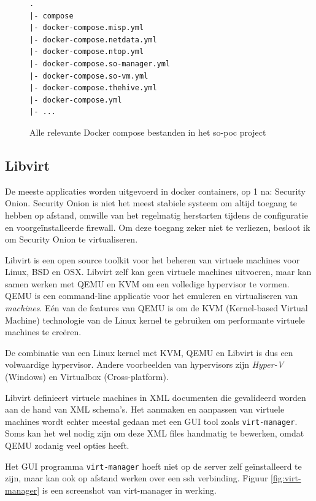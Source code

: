 \documentclass[a4paper,12pt]{report}
\begin{document}
\begin{figure}[H]
  \begin{lstlisting}
.
|- compose
|- docker-compose.misp.yml
|- docker-compose.netdata.yml
|- docker-compose.ntop.yml
|- docker-compose.so-manager.yml
|- docker-compose.so-vm.yml
|- docker-compose.thehive.yml
|- docker-compose.yml
|- ...
  \end{lstlisting}
  \caption{Alle relevante Docker compose bestanden in het so-poc project}
  \label{fig:compose-so-poc-files}
\end{figure}

\subsection{Libvirt}
De meeste applicaties worden uitgevoerd in docker containers, op 1 na: Security Onion.
Security Onion is niet het meest stabiele systeem om altijd toegang te hebben op afstand, omwille van het regelmatig herstarten tijdens de configuratie en voorgeïnstalleerde firewall.
Om deze toegang zeker niet te verliezen, besloot ik om Security Onion te virtualiseren.

Libvirt is een open source toolkit voor het beheren van virtuele machines voor Linux, BSD en OSX.
Libvirt zelf kan geen virtuele machines uitvoeren, maar kan samen werken met QEMU en KVM om een volledige hypervisor te vormen.
QEMU is een command-line applicatie voor het emuleren en virtualiseren van \emph{machines}.
Eén van de features van QEMU is om de KVM (Kernel-based Virtual Machine) technologie van de Linux kernel te gebruiken om performante virtuele machines te creëren.

De combinatie van een Linux kernel met KVM, QEMU en Libvirt is dus een volwaardige hypervisor.
Andere voorbeelden van hypervisors zijn \emph{Hyper-V} (Windows) en Virtualbox (Cross-platform).

Libvirt definieert virtuele machines in XML documenten die gevalideerd worden aan de hand van XML schema's.
Het aanmaken en aanpassen van virtuele machines wordt echter meestal gedaan met een GUI tool zoals \lstinline|virt-manager|.
Soms kan het wel nodig zijn om deze XML files handmatig te bewerken, omdat QEMU zodanig veel opties heeft.
\autocite{libvirt:docs}

Het GUI programma \lstinline|virt-manager| hoeft niet op de server zelf geïnstalleerd te zijn, maar kan ook op afstand werken over een ssh verbinding.
Figuur \ref{fig:virt-manager} is een screenshot van virt-manager in werking.
\end{document}

